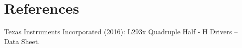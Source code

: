 \newpage

\section{References}

\begin{thebibliography}{99}
 Texas Instruments Incorporated (2016): L293x Quadruple Half - H Drivers -- Data Sheet.
\end{thebibliography} 